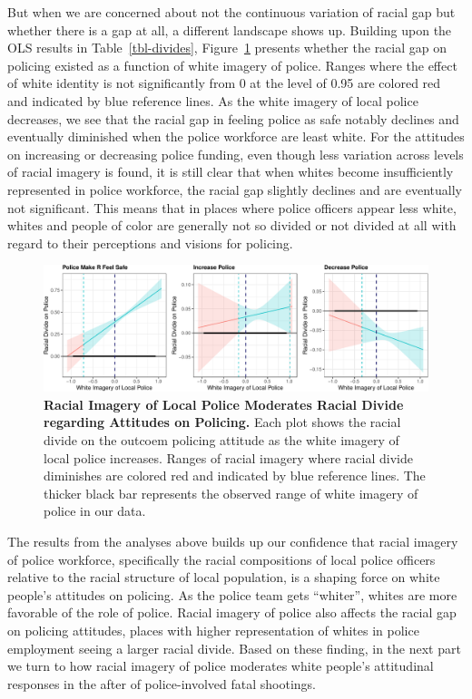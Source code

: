 \documentclass[
  12pt,
]{article}
\begin{document}
But when we are concerned about not the continuous variation of racial
gap but whether there is a gap at all, a different landscape shows up.
Building upon the OLS results in Table~\ref{tbl-divides},
Figure~\ref{fig-divides} presents whether the racial gap on policing
existed as a function of white imagery of police. Ranges where the
effect of white identity is not significantly from 0 at the level of
0.95 are colored red and indicated by blue reference lines. As the white
imagery of local police decreases, we see that the racial gap in feeling
police as safe notably declines and eventually diminished when the
police workforce are least white. For the attitudes on increasing or
decreasing police funding, even though less variation across levels of
racial imagery is found, it is still clear that when whites become
insufficiently represented in police workforce, the racial gap slightly
declines and are eventually not significant. This means that in places
where police officers appear less white, whites and people of color are
generally not so divided or not divided at all with regard to their
perceptions and visions for policing.

\begin{figure}[tb]

{\centering \includegraphics{racialized-police_files/figure-pdf/fig-divides-1.pdf}

}

\caption{\label{fig-divides}\textbf{Racial Imagery of Local Police
Moderates Racial Divide regarding Attitudes on Policing.} Each plot
shows the racial divide on the outcoem policing attitude as the white
imagery of local police increases. Ranges of racial imagery where racial
divide diminishes are colored red and indicated by blue reference lines.
The thicker black bar represents the observed range of white imagery of
police in our data.}

\end{figure}

The results from the analyses above builds up our confidence that racial
imagery of police workforce, specifically the racial compositions of
local police officers relative to the racial structure of local
population, is a shaping force on white people's attitudes on policing.
As the police team gets ``whiter'', whites are more favorable of the
role of police. Racial imagery of police also affects the racial gap on
policing attitudes, places with higher representation of whites in
police employment seeing a larger racial divide. Based on these finding,
in the next part we turn to how racial imagery of police moderates white
people's attitudinal responses in the after of police-involved fatal
shootings.
\end{document}
